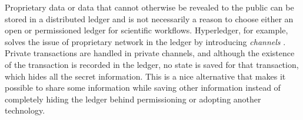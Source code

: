 Proprietary data or data that cannot otherwise be revealed to the public can be
stored in a distributed ledger and is not necessarily a reason to choose either
an open or permissioned ledger for scientific workflows. Hyperledger, for
example, solves the issue of proprietary network in the ledger by introducing
\textit{channels} \cite{noauthor_hyperledger_nodate}. Private transactions are
handled in private channels, and although the existence of the transaction is
recorded in the ledger, no state is saved for that transaction, which hides all
the secret information. This is a nice alternative that makes it possible to
share some information while saving other information instead of completely
hiding the ledger behind permissioning or adopting another technology.